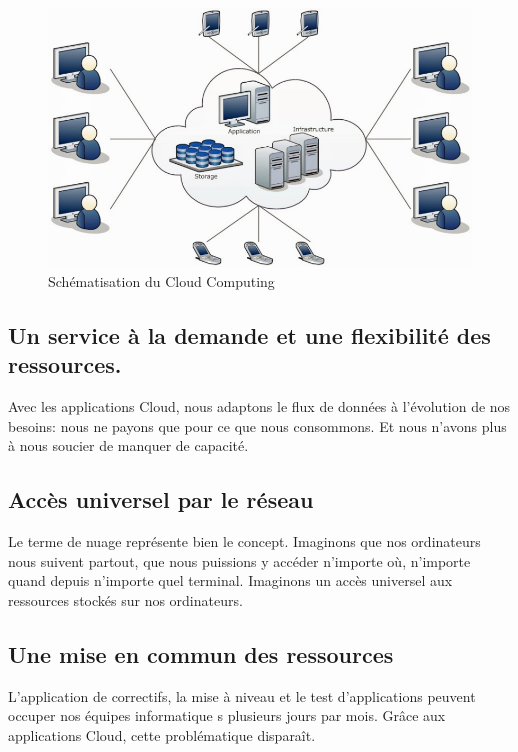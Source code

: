  \begin{figure}
    \begin{center}
      \includegraphics[scale=0.3]{images/CloudComputing.png}
    \end{center}
    \caption{Schématisation du Cloud Computing}
    \label{Cloud Computing}
  \end{figure}

  \subsection{Un service à la demande et une flexibilité des ressources.}
  Avec les applications Cloud, nous adaptons le flux de données à l'évolution de nos besoins: nous ne payons que pour ce que nous consommons. Et nous n'avons plus à nous soucier de manquer de capacité.

  \subsection{Accès universel par le réseau}
  Le terme de nuage représente bien le concept. Imaginons que nos ordinateurs nous suivent partout, que nous puissions y accéder n’importe où, n’importe quand depuis n’importe quel terminal. Imaginons un accès universel aux ressources stockés sur nos ordinateurs.

  \subsection{Une mise en commun des ressources}
  L'application de correctifs, la mise à niveau et le test d'applications peuvent occuper nos équipes informatique s plusieurs jours par mois. Grâce aux applications Cloud, cette problématique disparaît.\\

